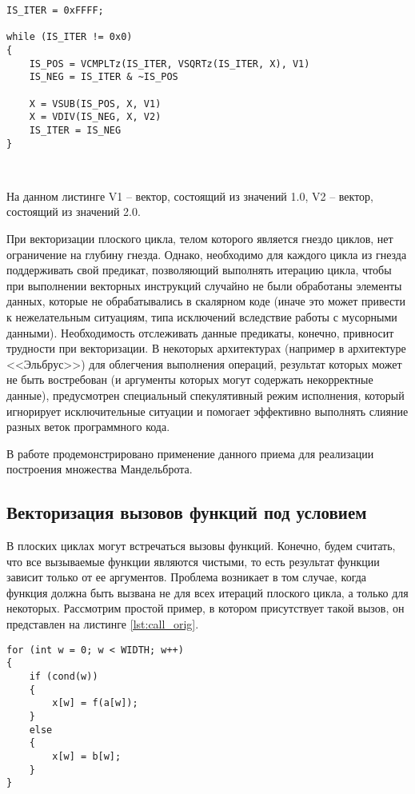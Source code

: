 \documentclass[
11pt,%
tightenlines,%
twoside,%
onecolumn,%
nofloats,%
nobibnotes,%
nofootinbib,%
superscriptaddress,%
noshowpacs,%
centertags]%
{revtex4}
\begin{document}
\begin{lstlisting}[caption={Векторная форма плоского цикла, содержащего цикл с неконстантным числом итераций},label={lst:while_loop_vec}]
IS_ITER = 0xFFFF;

while (IS_ITER != 0x0)
{
    IS_POS = VCMPLTz(IS_ITER, VSQRTz(IS_ITER, X), V1)
    IS_NEG = IS_ITER & ~IS_POS
    
    X = VSUB(IS_POS, X, V1)
    X = VDIV(IS_NEG, X, V2)
    IS_ITER = IS_NEG
}
\end{lstlisting}

\

На данном листинге V1 -- вектор, состоящий из значений 1.0, V2 -- вектор, состоящий из значений 2.0.

При векторизации плоского цикла, телом которого является гнездо циклов, нет ограничение на глубину гнезда.
Однако, необходимо для каждого цикла из гнезда поддерживать свой предикат, позволяющий выполнять итерацию цикла, чтобы при выполнении векторных инструкций случайно не были обработаны элементы данных, которые не обрабатывались в скалярном коде (иначе это может привести к нежелательным ситуациям, типа исключений вследствие работы с мусорными данными).
Необходимость отслеживать данные предикаты, конечно, привносит трудности при векторизации.
В некоторых архитектурах (например в архитектуре <<Эльбрус>>) для облегчения выполнения операций, результат которых может не быть востребован (и аргументы которых могут содержать некорректные данные), предусмотрен специальный спекулятивный режим исполнения, который игнорирует исключительные ситуации и помогает эффективно выполнять слияние разных веток программного кода.

В работе \cite{Krzikalla} продемонстрировано применение данного приема для реализации построения множества Мандельброта.

\subsection{Векторизация вызовов функций под условием}

В плоских циклах могут встречаться вызовы функций.
Конечно, будем считать, что все вызываемые функции являются чистыми, то есть результат функции зависит только от ее аргументов.
Проблема возникает в том случае, когда функция должна быть вызвана не для всех итераций плоского цикла, а только для некоторых.
Рассмотрим простой пример, в котором присутствует такой вызов, он представлен на листинге \ref{lst:call_orig}.

\begin{lstlisting}[caption={Пример плоского цикла с вызовом функции под условием},label={lst:call_orig}]
for (int w = 0; w < WIDTH; w++)
{
    if (cond(w))
    {
        x[w] = f(a[w]);
    }
    else
    {
        x[w] = b[w];
    }
}
\end{lstlisting}
\end{document}
